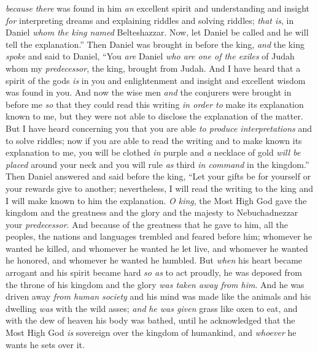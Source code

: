 \begin{biblechapter}
\verse \textit{because} \textit{there} was found in him \textit{an} excellent spirit and understanding and insight \textit{for} interpreting dreams and explaining riddles and solving riddles; \textit{that is}, in Daniel \textit{whom the king named} Belteshazzar. Now, let Daniel be called and he will tell the explanation.”
 Then Daniel was brought in before the king, \textit{and} the king \textit{spoke} and said to Daniel, “You \textit{are} Daniel \textit{who are one of the exiles} of Judah whom my \textit{predecessor}, the king, brought from Judah.
\verse And I have heard that a spirit of the gods \textit{is} in you and enlightenment and insight and excellent wisdom was found in you.
\verse And now the wise men \textit{and} the conjurers were brought in before me \textit{so} that they could read this writing \textit{in order to} make its explanation known to me, but they were not able to disclose the explanation of the matter.
\verse But I have heard concerning you that you are able \textit{to produce interpretations} and to solve riddles; now if you are able to read the writing and to make known its explanation to me, you will be clothed \textit{in} purple and \textit{a} necklace of gold \textit{will be placed} around your neck and you will rule \textit{as} third \textit{in command} in the kingdom.”
\verse Then Daniel answered and said before the king, “Let your gifts be for yourself or your rewards give to another; nevertheless, I will read the writing to the king and I will make known to him the explanation.
\verse \textit{O king}, the Most High God gave the kingdom and the greatness and the glory and the majesty to Nebuchadnezzar your \textit{predecessor}.
\verse And because of the greatness that he gave to him, all the peoples, the nations and languages trembled and feared before him; whomever he wanted he killed, and whomever he wanted he let live, and whomever he wanted he honored, and whomever he wanted he humbled.
\verse But \textit{when} his heart became arrogant and his spirit became hard \textit{so as} to act proudly, he was deposed from the throne of his kingdom and the glory \textit{was taken away from him}.
\verse And he was driven away \textit{from human society} and his mind was made like the animals and his dwelling \textit{was} with the wild asses; \textit{and} \textit{he was given} grass like oxen to eat, and with the dew of heaven his body was bathed, until he acknowledged that the Most High God \textit{is} sovereign over the kingdom of humankind, and \textit{whoever} he wants he sets over it.

\end{biblechapter}
